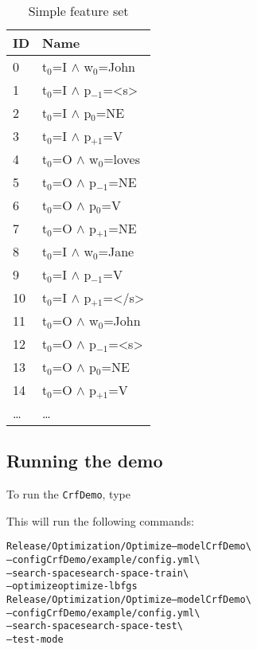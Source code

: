 \documentclass[12pt]{article}
\begin{document}
\begin{table}[h]
  \centering
  \begin{small}
  \begin{tabular}[h]{ l | l }
    ID & Name \\\hline
    0 & t$_0$=I $\land$ w$_0$=John\\
    1 & t$_0$=I $\land$ p$_{-1}$=<s>\\
    2 & t$_0$=I $\land$ p$_{0}$=NE\\
    3 & t$_0$=I $\land$ p$_{+1}$=V\\
    4 & t$_0$=O $\land$ w$_{0}$=loves\\
    5 & t$_0$=O $\land$ p$_{-1}$=NE\\
    6 & t$_0$=O $\land$ p$_{0}$=V\\
    7 & t$_0$=O $\land$ p$_{+1}$=NE\\
    8 & t$_0$=I $\land$ w$_{0}$=Jane\\
    9 & t$_0$=I $\land$ p$_{-1}$=V\\
    10 & t$_0$=I $\land$ p$_{+1}$=</s>\\
    11 & t$_0$=O $\land$ w$_0$=John\\
    12 & t$_0$=O $\land$ p$_{-1}$=<s>\\
    13 & t$_0$=O $\land$ p$_{0}$=NE\\
    14 & t$_0$=O $\land$ p$_{+1}$=V\\
    \dots & \dots
  \end{tabular}
  \end{small}
  \caption{Simple feature set}
  \label{tab:features}
\end{table}

\subsection{Running the demo}

To run the \texttt{CrfDemo}, type


This will run the following commands:

\begin{mdframed}\footnotesize\begin{alltt}
Release/Optimization/Optimize --model CrfDemo \textbackslash
  --config CrfDemo/example/config.yml \textbackslash
  --search-space search-space-train \textbackslash
  --optimize optimize-lbfgs
Release/Optimization/Optimize --model CrfDemo \textbackslash
  --config CrfDemo/example/config.yml \textbackslash
  --search-space search-space-test \textbackslash
  --test-mode
\end{alltt}\end{mdframed}
\end{document}
